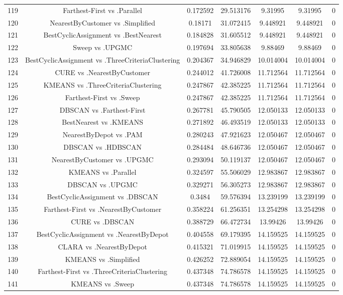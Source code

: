 \documentclass[a4paper,10pt]{article}
\begin{document}
\begin{landscape}
\begin{table}[!htp]
\begin{tabular}{ccccccc}
119&Farthest-First vs .Parallel&0.172592&29.513176&9.31995&9.31995&0\\
120&NearestByCustomer vs .Simplified&0.18171&31.072415&9.448921&9.448921&0\\
121&BestCyclicAssignment vs .BestNearest&0.184828&31.605512&9.448921&9.448921&0\\
122&Sweep vs .UPGMC&0.197694&33.805638&9.88469&9.88469&0\\
123&BestCyclicAssignment vs .ThreeCriteriaClustering&0.204367&34.946829&10.014004&10.014004&0\\
124&CURE vs .NearestByCustomer&0.244012&41.726008&11.712564&11.712564&0\\
125&KMEANS vs .ThreeCriteriaClustering&0.247867&42.385225&11.712564&11.712564&0\\
126&Farthest-First vs .Sweep&0.247867&42.385225&11.712564&11.712564&0\\
127&DBSCAN vs .Farthest-First&0.267781&45.790505&12.050133&12.050133&0\\
128&BestNearest vs .KMEANS&0.271892&46.493519&12.050133&12.050133&0\\
129&NearestByDepot vs .PAM&0.280243&47.921623&12.050467&12.050467&0\\
130&DBSCAN vs .HDBSCAN&0.284484&48.646736&12.050467&12.050467&0\\
131&NearestByCustomer vs .UPGMC&0.293094&50.119137&12.050467&12.050467&0\\
132&KMEANS vs .Parallel&0.324597&55.506029&12.983867&12.983867&0\\
133&DBSCAN vs .UPGMC&0.329271&56.305273&12.983867&12.983867&0\\
134&BestCyclicAssignment vs .DBSCAN&0.3484&59.576394&13.239199&13.239199&0\\
135&Farthest-First vs .NearestByCustomer&0.358224&61.256351&13.254298&13.254298&0\\
136&CURE vs .DBSCAN&0.388729&66.472734&13.99426&13.99426&0\\
137&BestCyclicAssignment vs .NearestByDepot&0.404558&69.179395&14.159525&14.159525&0\\
138&CLARA vs .NearestByDepot&0.415321&71.019915&14.159525&14.159525&0\\
139&KMEANS vs .Simplified&0.426252&72.889054&14.159525&14.159525&0\\
140&Farthest-First vs .ThreeCriteriaClustering&0.437348&74.786578&14.159525&14.159525&0\\
141&KMEANS vs .Sweep&0.437348&74.786578&14.159525&14.159525&0\\

\end{tabular}
\end{table}
\end{landscape}
\end{document}
